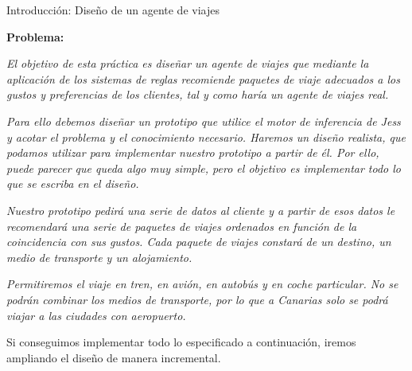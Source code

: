 \documentclass[11pt, a4paper, spanish, openright, twoside]{book}
\begin{document}
\begin{section}{Introducción: Diseño de un agente de viajes}

	\textbf{Problema:} 
	
	\textit{El objetivo de esta práctica es diseñar un agente de viajes que mediante la aplicación de los sistemas de reglas recomiende paquetes de viaje adecuados a los gustos y preferencias de los 
			clientes, tal y como haría un agente de viajes real.}
	
	\textit{Para ello debemos diseñar un prototipo que utilice el motor de inferencia de Jess y acotar el problema y el conocimiento necesario. Haremos un diseño realista, que podamos utilizar para implementar nuestro prototipo a partir de él. Por ello, 
		puede parecer que queda algo muy simple, pero el objetivo es implementar todo lo que se escriba en el diseño.}
	
	\textit{Nuestro prototipo pedirá una serie de datos al cliente y a partir de esos datos le recomendará una serie de paquetes de viajes ordenados en función de la coincidencia con sus gustos. Cada paquete 
		de viajes constará de un destino, un medio de transporte y un alojamiento.}

	
	\textit{Permitiremos el viaje en tren,  en avión, en autobús y en coche particular. No se podrán combinar los medios de transporte, por lo que a Canarias solo se podrá viajar a las ciudades con aeropuerto.}
	
	Si conseguimos implementar todo lo especificado a continuación, iremos ampliando el diseño de manera incremental.
\end{section}
\end{document}
